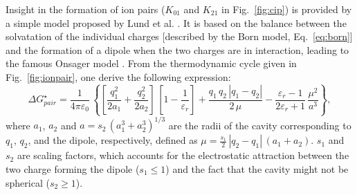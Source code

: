 \documentclass[review]{elsarticle}
\begin{document}
Insight in the formation of ion pairs ($K_{01}$ and $K_{21}$ in Fig.~\ref{fig:cip}) is provided by a simple model proposed by Lund et al. \cite{lundDielectricInterpretationSpecificity2010}. It is based on the balance between the solvatation of the individual charges [described by the Born model, Eq.~\eqref{eq:born}] and the formation of a dipole when the two charges are in interaction, leading to the famous Onsager model \cite{onsagerElectricMomentsMolecules1936,aubretUnderstandingLocalField2019}. From the thermodynamic cycle given in Fig.~\ref{fig:ionpair}, one derive the following expression:\begin{equation}
	\Delta G_{pair}^\star = \frac{1}{4\pi\varepsilon_0}\,\left\{\left[\frac{q_1^2}{2a_1}+\frac{q_2^2}{2a_2}\right]\,\left[1-\frac{1}{\varepsilon_r}\right]+\frac{q_1\,q_2\,|q_1-q_2|}{2\,\mu}-\frac{\varepsilon_r-1}{2\varepsilon_r+1}\,\frac{\mu^2}{a^3}\right\},
\end{equation}
where $a_1$, $a_2$ and $a=s_2\,( a_1^3+a_2^3)^{1/3}$ are the radii of the cavity corresponding to $q_1$, $q_2$, and the dipole, respectively, defined as $\mu = \frac{s_1}{2}\,|q_2-q_1|\,(a_1+a_2)$.  $s_1$ and $s_2$ are scaling factors, which accounts for the electrostatic attraction between the two charge forming the dipole ($s_1\leq 1$) and the fact that the cavity might not be spherical ($s_2\geq 1$).
\end{document}

